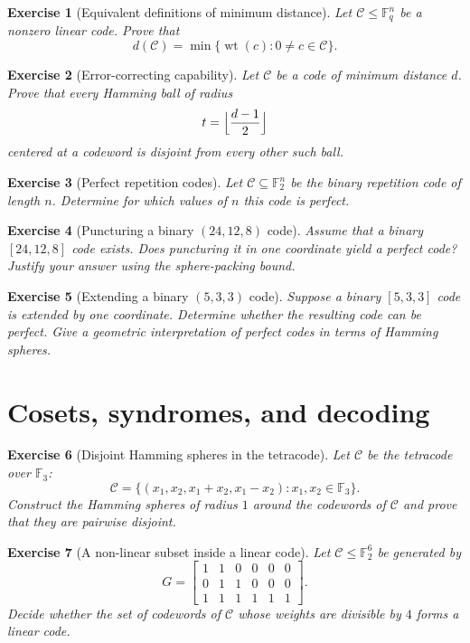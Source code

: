 \documentclass[11pt]{amsbook}
\theoremstyle{exstyle}
\newtheorem{exercise}{Exercise}
\theoremstyle{plain}
\newcommand{\F}{\mathbb{F}}
\newcommand{\Ccal}{\mathcal{C}}
\newcommand{\wt}{\operatorname{wt}}
\begin{document}
\begin{exercise}[Equivalent definitions of minimum distance]
Let $\Ccal\leq \F_q^n$ be a nonzero linear code. Prove that
\[
d(\Ccal)=\min\{\wt(c):0\neq c\in\Ccal\}.
\]
\end{exercise}

\begin{exercise}[Error-correcting capability]
Let $\Ccal$ be a code of minimum distance $d$. Prove that every Hamming ball of radius
\[
t=\Bigl\lfloor\frac{d-1}{2}\Bigr\rfloor
\]
centered at a codeword is disjoint from every other such ball.
\end{exercise}

\begin{exercise}[Perfect repetition codes]
Let $\Ccal\subseteq\F_2^n$ be the binary repetition code of length $n$. Determine for which values of $n$ this code is perfect.
\end{exercise}

\begin{exercise}[Puncturing a binary $(24,12,8)$ code]
Assume that a binary $[24,12,8]$ code exists. Does puncturing it in one coordinate yield a perfect code? Justify your answer using the sphere-packing bound.
\end{exercise}

\begin{exercise}[Extending a binary $(5,3,3)$ code]
Suppose a binary $[5,3,3]$ code is extended by one coordinate. Determine whether the resulting code can be perfect. Give a geometric interpretation of perfect codes in terms of Hamming spheres.
\end{exercise}

\section{Cosets, syndromes, and decoding}

\begin{exercise}[Disjoint Hamming spheres in the tetracode]
Let $\Ccal$ be the tetracode over $\F_3$:
\[
\Ccal=\{(x_1,x_2,x_1+x_2,x_1-x_2):x_1,x_2\in\F_3\}.
\]
Construct the Hamming spheres of radius $1$ around the codewords of $\Ccal$ and prove that they are pairwise disjoint.
\end{exercise}

\begin{exercise}[A non-linear subset inside a linear code]
Let $\Ccal\leq\F_2^6$ be generated by
\[
G=
\begin{bmatrix}
1&1&0&0&0&0\\
0&1&1&0&0&0\\
1&1&1&1&1&1
\end{bmatrix}.
\]
Decide whether the set of codewords of $\Ccal$ whose weights are divisible by $4$ forms a linear code.
\end{exercise}
\end{document}
